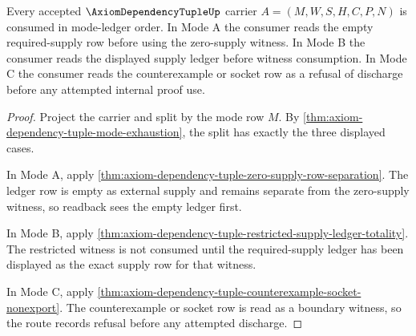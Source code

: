 \begin{theorem}
\label{thm:axiom-dependency-tuple-mode-ledger-priority}
Every accepted $\AxiomDependencyTupleUp$ carrier
$A=(M,W,S,H,C,P,N)$ is consumed in mode-ledger order. In Mode A the consumer
reads the empty required-supply row before using the zero-supply witness. In
Mode B the consumer reads the displayed supply ledger before witness
consumption. In Mode C the consumer reads the counterexample or socket row as a
refusal of discharge before any attempted internal proof use.
\end{theorem}
\begin{proof}
Project the carrier and split by the mode row $M$. By
\autoref{thm:axiom-dependency-tuple-mode-exhaustion}, the split has exactly the
three displayed cases.

In Mode A, apply
\autoref{thm:axiom-dependency-tuple-zero-supply-row-separation}. The ledger row
is empty as external supply and remains separate from the zero-supply witness,
so readback sees the empty ledger first.

In Mode B, apply
\autoref{thm:axiom-dependency-tuple-restricted-supply-ledger-totality}. The
restricted witness is not consumed until the required-supply ledger has been
displayed as the exact supply row for that witness.

In Mode C, apply
\autoref{thm:axiom-dependency-tuple-counterexample-socket-nonexport}. The
counterexample or socket row is read as a boundary witness, so the route records
refusal before any attempted discharge.
\end{proof}


